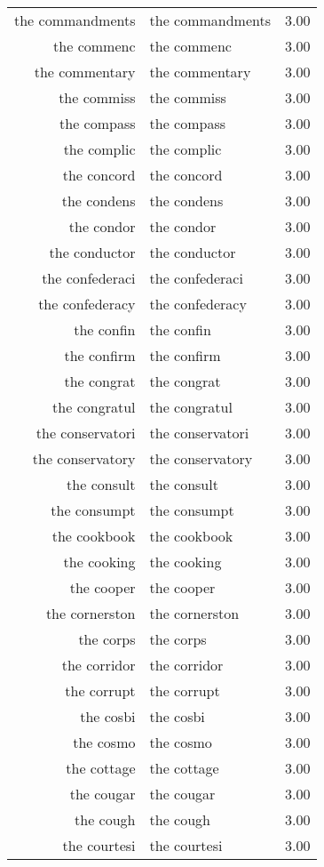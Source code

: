 \begin{table}[ht]
\begin{tabular}{rlr}
  the commandments & the commandments & 3.00 \\ 
  the commenc & the commenc & 3.00 \\ 
  the commentary & the commentary & 3.00 \\ 
  the commiss & the commiss & 3.00 \\ 
  the compass & the compass & 3.00 \\ 
  the complic & the complic & 3.00 \\ 
  the concord & the concord & 3.00 \\ 
  the condens & the condens & 3.00 \\ 
  the condor & the condor & 3.00 \\ 
  the conductor & the conductor & 3.00 \\ 
  the confederaci & the confederaci & 3.00 \\ 
  the confederacy & the confederacy & 3.00 \\ 
  the confin & the confin & 3.00 \\ 
  the confirm & the confirm & 3.00 \\ 
  the congrat & the congrat & 3.00 \\ 
  the congratul & the congratul & 3.00 \\ 
  the conservatori & the conservatori & 3.00 \\ 
  the conservatory & the conservatory & 3.00 \\ 
  the consult & the consult & 3.00 \\ 
  the consumpt & the consumpt & 3.00 \\ 
  the cookbook & the cookbook & 3.00 \\ 
  the cooking & the cooking & 3.00 \\ 
  the cooper & the cooper & 3.00 \\ 
  the cornerston & the cornerston & 3.00 \\ 
  the corps & the corps & 3.00 \\ 
  the corridor & the corridor & 3.00 \\ 
  the corrupt & the corrupt & 3.00 \\ 
  the cosbi & the cosbi & 3.00 \\ 
  the cosmo & the cosmo & 3.00 \\ 
  the cottage & the cottage & 3.00 \\ 
  the cougar & the cougar & 3.00 \\ 
  the cough & the cough & 3.00 \\ 
  the courtesi & the courtesi & 3.00 \\ 

\end{tabular}
\end{table}
